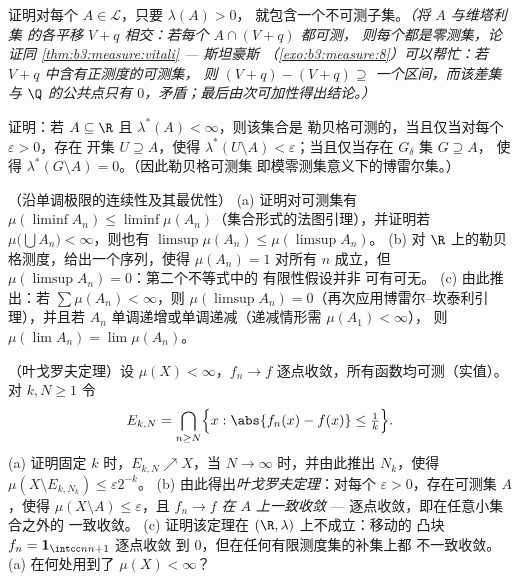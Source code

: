 \begin{exercise}[$\star\star\star$]\label{exo:b3:measure:9}
证明对每个 $A \in \mathcal L$，只要 $\lambda(A) > 0$，
就包含一个不可测子集。\emph{（将 $A$ 与维塔利集
的各平移 $V + q$ 相交：若每个 $A \cap (V+q)$ 都可测，
则每个都是零测集，论证同
\cref{thm:b3:measure:vitali} --- 斯坦豪斯
（\cref{exo:b3:measure:8}）可以帮忙：若 $V + q$ 中含有正测度的可测集，
则 $(V+q) - (V+q) \supseteq$
一个区间，而该差集与 $\Q$ 的公共点只有
$0$，矛盾；最后由次可加性得出结论。）}
\end{exercise}

\begin{exercise}[$\star\star$]\label{exo:b3:measure:10}
证明：若 $A \subseteq \R$ 且 $\lambda^*(A) < \infty$，则该集合是
勒贝格可测的，当且仅当对每个 $\varepsilon > 0$，存在
开集 $U \supseteq A$，使得 $\lambda^*(U \setminus A) <
\varepsilon$；当且仅当存在 $G_\delta$ 集 $G \supseteq A$，
使得 $\lambda^*(G\setminus A) = 0$。（因此勒贝格可测集
即模零测集意义下的博雷尔集。）
\end{exercise}

\begin{exercise}[$\star\star$]\label{exo:b3:measure:11}
（沿单调极限的连续性及其最优性）
(a) 证明对可测集有 $\mu(\liminf A_n) \leq
\liminf\mu(A_n)$（集合形式的法图引理），并证明若
$\mu\bigl(\bigcup A_n\bigr) < \infty$，则也有
$\limsup\mu(A_n) \leq \mu(\limsup A_n)$。
(b) 对 $\R$ 上的勒贝格测度，给出一个序列，使得
$\mu(A_n) = 1$ 对所有 $n$ 成立，但 $\mu(\limsup A_n) = 0$：第二个不等式中的
有限性假设并非
可有可无。
(c) 由此推出：若 $\sum\mu(A_n) < \infty$，则
$\mu(\limsup A_n) = 0$（再次应用博雷尔–坎泰利引理），并且若
$A_n$ 单调递增或单调递减（递减情形需 $\mu(A_1) < \infty$），
则 $\mu(\lim A_n) = \lim\mu(A_n)$。
\end{exercise}

\begin{exercise}[$\star\star\star$]\label{exo:b3:measure:12}
（叶戈罗夫定理）设 $\mu(X) < \infty$，$f_n \to f$
逐点收敛，所有函数均可测（实值）。对 $k, N \geq 1$
令
\[
E_{k,N} = \bigcap_{n \geq N}\Bigl\{x : \abs{f_n(x) - f(x)}
\leq \tfrac1k\Bigr\} .
\]
(a) 证明固定 $k$ 时，$E_{k,N} \nearrow X$，当 $N \to
\infty$ 时，并由此推出 $N_k$，使得 $\mu(X \setminus E_{k,N_k})
\leq \varepsilon2^{-k}$。
(b) 由此得出\emph{叶戈罗夫定理}：对每个 $\varepsilon
> 0$，存在可测集 $A$，使得 $\mu(X\setminus A) \leq
\varepsilon$，且 $f_n \to f$ \emph{在 $A$ 上一致收敛}
--- 逐点收敛，即在任意小集合之外的
一致收敛。
(c) 证明该定理在 $(\R, \lambda)$ 上不成立：移动的
凸块 $f_n = \mathbf 1_{\intcc n{n+1}}$ 逐点收敛
到 $0$，但在任何有限测度集的补集上都
不一致收敛。(a) 在何处用到了 $\mu(X) < \infty$？
\end{exercise}


